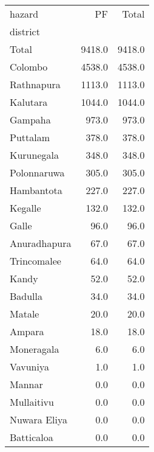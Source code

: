\begin{tabular}{lrr}
\toprule
hazard &      PF &   Total \\
district     &         &         \\
\midrule
Total        &  9418.0 &  9418.0 \\
Colombo      &  4538.0 &  4538.0 \\
Rathnapura   &  1113.0 &  1113.0 \\
Kalutara     &  1044.0 &  1044.0 \\
Gampaha      &   973.0 &   973.0 \\
Puttalam     &   378.0 &   378.0 \\
Kurunegala   &   348.0 &   348.0 \\
Polonnaruwa  &   305.0 &   305.0 \\
Hambantota   &   227.0 &   227.0 \\
Kegalle      &   132.0 &   132.0 \\
Galle        &    96.0 &    96.0 \\
Anuradhapura &    67.0 &    67.0 \\
Trincomalee  &    64.0 &    64.0 \\
Kandy        &    52.0 &    52.0 \\
Badulla      &    34.0 &    34.0 \\
Matale       &    20.0 &    20.0 \\
Ampara       &    18.0 &    18.0 \\
Moneragala   &     6.0 &     6.0 \\
Vavuniya     &     1.0 &     1.0 \\
Mannar       &     0.0 &     0.0 \\
Mullaitivu   &     0.0 &     0.0 \\
Nuwara Eliya &     0.0 &     0.0 \\
Batticaloa   &     0.0 &     0.0 \\
\bottomrule
\end{tabular}
